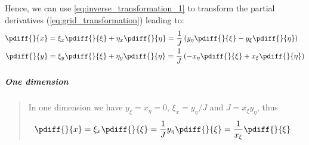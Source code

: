 Hence, we can use \autoref{eq:inverse_transformation_1} to transform the partial derivatives (\autoref{eq:grid_transformation}) leading to:
	\begin{align}\label{trans}
		\pdiff{}{x}
		&=\xi_x\pdiff{}{\xi}
		+ \eta_x\pdiff{}{\eta}
		=\frac{1}{J}\left(y_{\eta} \pdiff{}{\xi}
		-y_{\xi}\pdiff{}{\eta}\right)
\\
		\pdiff{}{y}
		&=\xi_y\pdiff{}{\xi}
		+\eta_y \pdiff{}{\eta}
		=\frac{1}{J}\left(-x_{\eta}\pdiff{}{\xi}
		+x_{\xi}\pdiff{}{\eta}
		\right)
	\end{align}
\subparagraph*{One dimension}
\begin{quote}
{{\scriptsize
In one dimension we have $y_\xi = x_\eta = 0$, $\xi_x = y_\eta/J$ and $J = x_\xi y_\eta$, thus
\begin{align}
    \pdiff{}{x}
    &=\xi_x\pdiff{}{\xi}
    =\frac{1}{J}y_{\eta} \pdiff{}{\xi}
    = \frac{1}{x_\xi} \pdiff{}{\xi}
\end{align}
}}
\end{quote}
